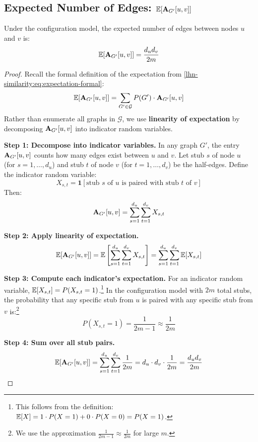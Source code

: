 \begin{notechapter}
\subsection{Expected Number of Edges: $\mathbb{E}[\mathbf{A}_{G'}[u,v]]$}

\begin{proposition}
\label{lhn-similarity:prop:expected-edge}
Under the configuration model, the expected number of edges between nodes $u$ and $v$ is:
\begin{equation}
\mathbb{E}[\mathbf{A}_{G'}[u,v]] = \frac{d_u d_v}{2m}
\label{lhn-similarity:eq:expected-edge}
\end{equation}
\end{proposition}

\begin{proof}
Recall the formal definition of the expectation from \cref{lhn-similarity:eq:expectation-formal}:
\[
\mathbb{E}[\mathbf{A}_{G'}[u,v]] = \sum_{G' \in \mathcal{G}} P(G') \cdot \mathbf{A}_{G'}[u,v]
\]
Rather than enumerate all graphs in $\mathcal{G}$, we use \textbf{linearity of expectation} by decomposing $\mathbf{A}_{G'}[u,v]$ into indicator random variables.

\textbf{Step 1: Decompose into indicator variables.} 
In any graph $G'$, the entry $\mathbf{A}_{G'}[u,v]$ counts how many edges exist between $u$ and $v$. Let stub $s$ of node $u$ (for $s = 1, \ldots, d_u$) and stub $t$ of node $v$ (for $t = 1, \ldots, d_v$) be the half-edges. Define the indicator random variable:
\[
X_{s,t} = \mathbf{1}[\text{stub } s \text{ of } u \text{ is paired with stub } t \text{ of } v]
\]
Then:
\[
\mathbf{A}_{G'}[u,v] = \sum_{s=1}^{d_u} \sum_{t=1}^{d_v} X_{s,t}
\]

\textbf{Step 2: Apply linearity of expectation.}
\[
\mathbb{E}[\mathbf{A}_{G'}[u,v]] = \mathbb{E}\left[\sum_{s=1}^{d_u} \sum_{t=1}^{d_v} X_{s,t}\right] = \sum_{s=1}^{d_u} \sum_{t=1}^{d_v} \mathbb{E}[X_{s,t}]
\]

\textbf{Step 3: Compute each indicator's expectation.}
For an indicator random variable, $\mathbb{E}[X_{s,t}] = P(X_{s,t} = 1)$.\footnote{This follows from the definition: $\mathbb{E}[X] = 1 \cdot P(X=1) + 0 \cdot P(X=0) = P(X=1)$.} In the configuration model with $2m$ total stubs, the probability that any specific stub from $u$ is paired with any specific stub from $v$ is:\footnote{We use the approximation $\frac{1}{2m-1} \approx \frac{1}{2m}$ for large $m$.}
\[
P(X_{s,t} = 1) = \frac{1}{2m-1} \approx \frac{1}{2m}
\]

\textbf{Step 4: Sum over all stub pairs.}
\[
\mathbb{E}[\mathbf{A}_{G'}[u,v]] = \sum_{s=1}^{d_u} \sum_{t=1}^{d_v} \frac{1}{2m} = d_u \cdot d_v \cdot \frac{1}{2m} = \frac{d_u d_v}{2m}
\]
\end{proof}


\end{notechapter}
